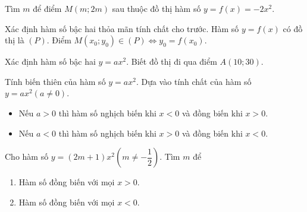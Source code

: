 \begin{vd}
	Tìm $ m $ để điểm $ M(m;2m) $ sau thuộc đồ thị hàm số $ y = f(x) = -2x^2 $.
\end{vd}

\begin{dang}{Xác định hàm số bậc hai thỏa mãn tính chất cho trước.}
	Hàm số $ y = f(x) $ có đồ thị là $ (P) $. Điểm $ M(x_0;y_0) \in (P) \Leftrightarrow y_0 = f(x_0) $.
\end{dang}
\begin{vd}
	Xác định hàm số bậc hai $ y = ax^2 $. Biết đồ thị đi qua điểm $ A(10;30) $.
\end{vd}

\begin{dang}{Tính biến thiên của hàm số $ y = ax^2 $.}
	Dựa vào tính chất của hàm số $ y = ax^2 (a \neq 0) $.
	\begin{itemize}
		\item Nếu $ a > 0 $ thì hàm số nghịch biến khi $ x < 0 $ và đồng biến khi $ x > 0 $.
		\item Nếu $ a < 0 $ thì hàm số nghịch biến khi $ x > 0 $ và đồng biến khi $ x < 0 $.
	\end{itemize}
\end{dang}

\begin{vd}
	Cho hàm số $ y = (2m + 1)x^2(m \neq -\dfrac{1}{2}) $. Tìm $ m $ để
	\begin{enumerate}
		\item Hàm số đồng biến với mọi $ x > 0 $.
		\item Hàm số đồng biến với mọi $ x < 0 $.
	\end{enumerate}
\end{vd}

